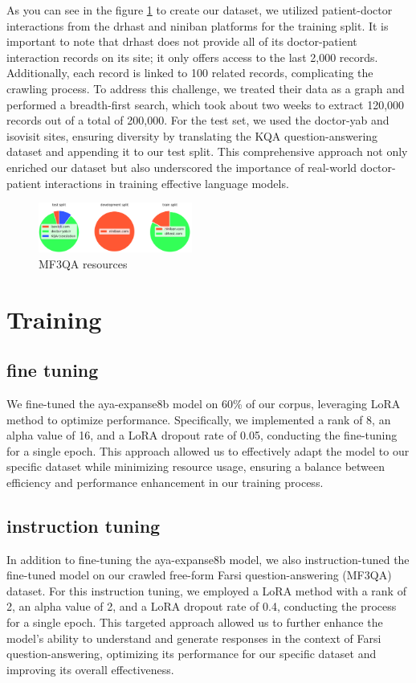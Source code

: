 \documentclass[conference]{IEEEtran}
\begin{document}
As you can see in the figure
\ref{fig2}
to create our dataset, we utilized patient-doctor interactions from the drhast and niniban platforms for the training split. It is important to note that drhast does not provide all of its doctor-patient interaction records on its site; it only offers access to the last 2,000 records. Additionally, each record is linked to 100 related records, complicating the crawling process. To address this challenge, we treated their data as a graph and performed a breadth-first search, which took about two weeks to extract 120,000 records out of a total of 200,000. For the test set, we used the doctor-yab and isovisit sites, ensuring diversity by translating the KQA question-answering dataset
\cite{b10}
and appending it to our test split. This comprehensive approach not only enriched our dataset but also underscored the importance of real-world doctor-patient interactions in training effective language models.

\begin{figure}[htbp]
	\centerline{\includegraphics[width=0.45\textwidth]{fig2.png}}
	\caption{MF3QA resources}
	\label{fig2}
\end{figure}

\section{Training}
\subsection{fine tuning}
We fine-tuned the aya-expanse8b model on 60\% of our corpus, leveraging LoRA
\cite{b13}
method to optimize performance. Specifically, we implemented a rank of 8, an alpha value of 16, and a LoRA dropout rate of 0.05, conducting the fine-tuning for a single epoch. This approach allowed us to effectively adapt the model to our specific dataset while minimizing resource usage, ensuring a balance between efficiency and performance enhancement in our training process.
\subsection{instruction tuning}
In addition to fine-tuning the aya-expanse8b model, we also instruction-tuned the fine-tuned model on our crawled free-form Farsi question-answering (MF3QA) dataset. For this instruction tuning, we employed a LoRA method with a rank of 2, an alpha value of 2, and a LoRA dropout rate of 0.4, conducting the process for a single epoch. This targeted approach allowed us to further enhance the model’s ability to understand and generate responses in the context of Farsi question-answering, optimizing its performance for our specific dataset and improving its overall effectiveness.
\end{document}

